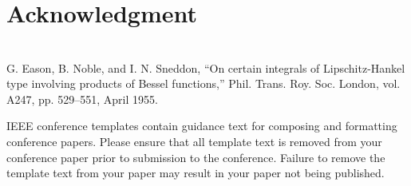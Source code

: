 \documentclass[conference]{IEEEtran}
\begin{document}
\section*{Acknowledgment}


\section*{}


\begin{thebibliography}{00}
 G. Eason, B. Noble, and I. N. Sneddon, ``On certain integrals of Lipschitz-Hankel type involving products of Bessel functions,'' Phil. Trans. Roy. Soc. London, vol. A247, pp. 529--551, April 1955.

\end{thebibliography}
\vspace{12pt}
\color{red}
IEEE conference templates contain guidance text for composing and formatting conference papers. Please ensure that all template text is removed from your conference paper prior to submission to the conference. Failure to remove the template text from your paper may result in your paper not being published.
\end{document}
